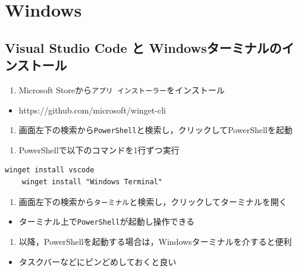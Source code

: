 \chapter{Windows}

\section{Visual Studio Code と Windowsターミナルのインストール}


\begin{enumerate}
\item Microsoft Storeから\texttt{アプリ インストーラー}をインストール
\end{enumerate}


\begin{itemize}
\item https://github.com/microsoft/winget-cli
\end{itemize}


\begin{enumerate}
\item 画面左下の検索から\texttt{PowerShell}と検索し，クリックしてPowerShellを起動
\end{enumerate}


\begin{enumerate}
\item PowerShellで以下のコマンドを1行ずつ実行
\end{enumerate}


\begin{lstlisting}[style=codecell]
    winget install vscode
    winget install "Windows Terminal"
\end{lstlisting}


\begin{enumerate}
\item 画面左下の検索から\texttt{ターミナル}と検索し，クリックしてターミナルを開く
\end{enumerate}

\begin{itemize}
\item ターミナル上で\texttt{PowerShell}が起動し操作できる
\end{itemize}


\begin{enumerate}
\item 以降，PowerShellを起動する場合は，Windowsターミナルを介すると便利
\end{enumerate}


\begin{itemize}
\item タスクバーなどにピンどめしておくと良い
\end{itemize}


